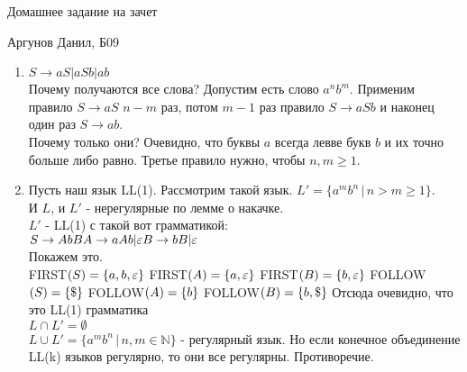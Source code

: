 \documentclass[12pt]{article}
\begin{document}
\begin{center} {\LARGE Домашнее задание на зачет} \end{center}
\begin{center} {Аргунов Данил, Б09} \end{center}

\bigskip
	
\begin{enumerate}
	\item $S \rightarrow aS | aSb | ab$\\
	Почему получаются все слова? Допустим есть слово $a^n b^m$. Применим правило $S \rightarrow aS$ $n-m$ раз, потом $m-1$ раз правило $S \rightarrow aSb$ и наконец один раз $S \rightarrow ab$.\\
	Почему только они? Очевидно, что буквы $a$ всегда левве букв $b$ и их точно больше либо равно. Третье правило нужно, чтобы $n, m \geqslant 1$.
	\item Пусть наш язык LL(1). Рассмотрим такой язык. $L' = \{a^mb^n \, | \, n > m \geqslant 1\}$.\\
	 И $L$, и $L'$ - нерегулярные по лемме о накачке.\\ $L'$ - LL(1) с такой вот грамматикой:\\
	$S \rightarrow AbB\\
	 A \rightarrow aAb | \varepsilon\\
	 B \rightarrow bB  | \varepsilon$\\
	 Покажем это.\\
	 FIRST$(S) = \{a, b, \varepsilon\}\\$
	 FIRST$(A) = \{a, \varepsilon\}\\$
	 FIRST$(B) = \{b, \varepsilon\}\\$
	 FOLLOW$(S) = \{\$\}\\$
	 FOLLOW$(A) = \{b\}\\$
	 FOLLOW$(B) = \{b, \$\}\\$
	 Отсюда очевидно, что это LL(1) грамматика\\
	 $L \cap L' = \emptyset$\\
	 $L \cup L' = \{a^mb^n\, | \, n, m \in \mathbb{N} \}$ - регулярный язык. Но если конечное объединение LL(k) языков регулярно, то они все регулярны. Противоречие. 
\end{enumerate}
\end{document}

